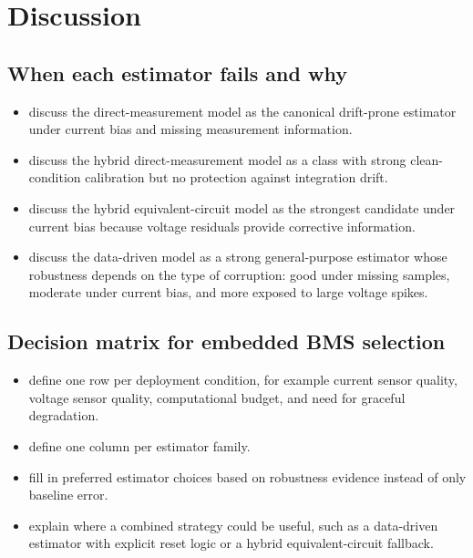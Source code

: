 \documentclass[review]{elsarticle}
\begin{document}
\section{Discussion}
\subsection{When each estimator fails and why}
\begin{itemize}[leftmargin=*]
    \item discuss the direct-measurement model as the canonical drift-prone estimator under current bias and missing measurement information.
    \item discuss the hybrid direct-measurement model as a class with strong clean-condition calibration but no protection against integration drift.
    \item discuss the hybrid equivalent-circuit model as the strongest candidate under current bias because voltage residuals provide corrective information.
    \item discuss the data-driven model as a strong general-purpose estimator whose robustness depends on the type of corruption: good under missing samples, moderate under current bias, and more exposed to large voltage spikes.
\end{itemize}

\subsection{Decision matrix for embedded BMS selection}
\begin{itemize}[leftmargin=*]
    \item define one row per deployment condition, for example current sensor quality, voltage sensor quality, computational budget, and need for graceful degradation.
    \item define one column per estimator family.
    \item fill in preferred estimator choices based on robustness evidence instead of only baseline error.
    \item explain where a combined strategy could be useful, such as a data-driven estimator with explicit reset logic or a hybrid equivalent-circuit fallback.
\end{itemize}
\end{document}
